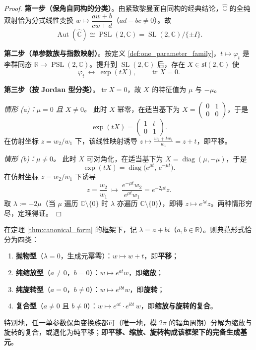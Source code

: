 \begin{proof}
\textbf{第一步（保角自同构的分类）}。由紧致黎曼面自同构的经典结论，$\hat{\mathbb C}$ 的全纯双射恰为分式线性变换 $w\mapsto\dfrac{aw+b}{cw+d}$（$ad-bc\neq0$）。故
\[
\operatorname{Aut}(\hat{\mathbb C})\cong \operatorname{PSL}(2,\mathbb C)=\operatorname{SL}(2,\mathbb C)/\{\pm I\}.
\]

\textbf{第二步（单参数族与指数映射）}。按定义 \ref{def:one_parameter_family}，$t\mapsto\varphi_t$ 是李群同态 $\mathbb R\to\operatorname{PSL}(2,\mathbb C)$。提升到 $\operatorname{SL}(2,\mathbb C)$ 后，存在 $X\in\mathfrak{sl}(2,\mathbb C)$ 使
\[
\varphi_t\ \longleftrightarrow\ \exp(tX),\qquad \operatorname{tr}X=0 .
\]

\textbf{第三步（按 Jordan 型分类）}。$\operatorname{tr}X=0$，故 $X$ 的特征值为 $\mu$ 与 $-\mu$。

\emph{情形 (a)：$\mu=0$ 且 $X\neq0$。} 此时 $X$ 幂零，在适当基下为 $X=\begin{pmatrix}0&1\\0&0\end{pmatrix}$，于是
\[
\exp(tX)=\begin{pmatrix}1&t\\0&1\end{pmatrix}.
\]
在仿射坐标 $z=w_2/w_1$ 下，该线性映射诱导 $z\mapsto\frac{w_2+tw_1}{w_1}=z+t$，即平移。

\emph{情形 (b)：$\mu\neq0$。} 此时 $X$ 可对角化，在适当基下为 $X=\operatorname{diag}(\mu,-\mu)$，于是
\[
\exp(tX)=\operatorname{diag}\bigl(e^{\mu t},\,e^{-\mu t}\bigr).
\]
在仿射坐标 $z=w_2/w_1$ 下诱导
\[
z=\frac{w_2}{w_1}\ \longmapsto\ \frac{e^{-\mu t}w_2}{e^{\mu t}w_1}=e^{-2\mu t}z .
\]
取 $\lambda:=-2\mu$（当 $\mu$ 遍历 $\mathbb C\setminus\{0\}$ 时 $\lambda$ 亦遍历 $\mathbb C\setminus\{0\}$），即得 $z\mapsto e^{\lambda t}z$。两种情形穷尽，定理得证。
\end{proof}

\begin{corollary}[三种基本变换的完备性]\label{cor:three_transformations_complete}
在定理 \ref{thm:canonical_form} 的框架下，记 $\lambda=a+bi$（$a,b\in\mathbb R$）。则典范形式恰分为四类：
\begin{enumerate}[label=(\roman*)]
    \item \textbf{抛物型}（$\lambda=0$，生成元幂零）：$w\mapsto w+t$，即\textbf{平移}；
    \item \textbf{纯缩放型}（$a\neq0$，$b=0$）：$w\mapsto e^{at}w$，即\textbf{缩放}；
    \item \textbf{纯旋转型}（$a=0$，$b\neq0$）：$w\mapsto e^{ibt}w$，即\textbf{旋转}；
    \item \textbf{复合型}（$a\neq0$ 且 $b\neq0$）：$w\mapsto e^{at}\cdot e^{ibt}\,w$，即\textbf{缩放与旋转的复合}。
\end{enumerate}
特别地，任一单参数保角变换族都可（唯一地，模 $2\pi$ 的辐角周期）分解为缩放与旋转的复合，或退化为纯平移；即\textbf{平移、缩放、旋转构成该框架下的完备生成基元}。
\end{corollary}

